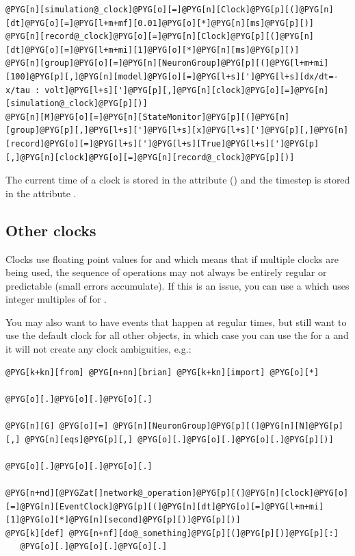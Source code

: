 \documentclass[letterpaper,10pt,english]{manual}
\begin{document}
\begin{Verbatim}[commandchars=@\[\]]
@PYG[n][simulation@_clock]@PYG[o][=]@PYG[n][Clock]@PYG[p][(]@PYG[n][dt]@PYG[o][=]@PYG[l+m+mf][0.01]@PYG[o][*]@PYG[n][ms]@PYG[p][)]
@PYG[n][record@_clock]@PYG[o][=]@PYG[n][Clock]@PYG[p][(]@PYG[n][dt]@PYG[o][=]@PYG[l+m+mi][1]@PYG[o][*]@PYG[n][ms]@PYG[p][)]
@PYG[n][group]@PYG[o][=]@PYG[n][NeuronGroup]@PYG[p][(]@PYG[l+m+mi][100]@PYG[p][,]@PYG[n][model]@PYG[o][=]@PYG[l+s][']@PYG[l+s][dx/dt=-x/tau : volt]@PYG[l+s][']@PYG[p][,]@PYG[n][clock]@PYG[o][=]@PYG[n][simulation@_clock]@PYG[p][)]
@PYG[n][M]@PYG[o][=]@PYG[n][StateMonitor]@PYG[p][(]@PYG[n][group]@PYG[p][,]@PYG[l+s][']@PYG[l+s][x]@PYG[l+s][']@PYG[p][,]@PYG[n][record]@PYG[o][=]@PYG[l+s][']@PYG[l+s][True]@PYG[l+s][']@PYG[p][,]@PYG[n][clock]@PYG[o][=]@PYG[n][record@_clock]@PYG[p][)]
\end{Verbatim}

The current time of a clock is stored in the attribute  () and
the timestep is stored in the attribute .


\subsection{Other clocks}

Clocks use floating point values for  and  which means that if
multiple clocks are being used, the sequence of operations may not always be
entirely regular or predictable (small errors accumulate). If this is an issue,
you can use a \hyperlink{brian.RegularClock}{} which uses integer multiples of  for .

You may also want to have events that happen at regular times, but still want to
use the default clock for all other objects, in which case you can use the
\hyperlink{brian.EventClock}{} for a \hyperlink{brian.network_operation}{} and it will not create any
clock ambiguities, e.g.:

\begin{Verbatim}[commandchars=@\[\]]
@PYG[k+kn][from] @PYG[n+nn][brian] @PYG[k+kn][import] @PYG[o][*]

@PYG[o][.]@PYG[o][.]@PYG[o][.]

@PYG[n][G] @PYG[o][=] @PYG[n][NeuronGroup]@PYG[p][(]@PYG[n][N]@PYG[p][,] @PYG[n][eqs]@PYG[p][,] @PYG[o][.]@PYG[o][.]@PYG[o][.]@PYG[p][)]

@PYG[o][.]@PYG[o][.]@PYG[o][.]

@PYG[n+nd][@PYGZat[]network@_operation]@PYG[p][(]@PYG[n][clock]@PYG[o][=]@PYG[n][EventClock]@PYG[p][(]@PYG[n][dt]@PYG[o][=]@PYG[l+m+mi][1]@PYG[o][*]@PYG[n][second]@PYG[p][)]@PYG[p][)]
@PYG[k][def] @PYG[n+nf][do@_something]@PYG[p][(]@PYG[p][)]@PYG[p][:]
   @PYG[o][.]@PYG[o][.]@PYG[o][.]
\end{Verbatim}
\end{document}
